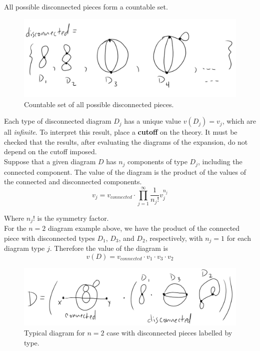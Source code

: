 \noindent All possible disconnected pieces form a countable set. 

\begin{figure}[H]
	\centering
	\includegraphics[scale=0.4]{countable.png}
	\caption{Countable set of all possible disconnected pieces.}
\end{figure}

\noindent Each type of disconnected diagram $D_j$ has a unique value $v(D_j)=v_j$, which are all \textit{infinite}. To interpret this result, place a \textbf{cutoff} on the theory. It must be checked that the results, after evaluating the diagrams of the expansion, do not depend on the cutoff imposed. \\

\noindent Suppose that a given diagram $D$ has $n_j$ components of type $D_j$, including the connected component. The value of the diagram is the product of the values of the connected and disconnected components.
\begin{equation}
v_j = v_{connected} \cdot \prod_{j=1}^{\infty} \frac{1}{n_j !} v_j^{n_j}
\end{equation}

\noindent Where $n_j !$ is the symmetry factor. \\

\noindent For the $n=2$ diagram example above, we have the product of the connected piece with disconnected types $D_1$, $D_3$, and $D_2$, respectively, with $n_j=1$ for each diagram type $j$. Therefore the value of the diagram is
\begin{equation}
v(D) = v_{connected} \cdot v_1 \cdot v_3 \cdot v_2
\end{equation}

\begin{figure}[H]
	\centering
	\includegraphics[scale=0.4]{n2diagramslabel.png}
	\caption{Typical diagram for $n=2$ case with disconnected pieces labelled by type.}
\end{figure}

